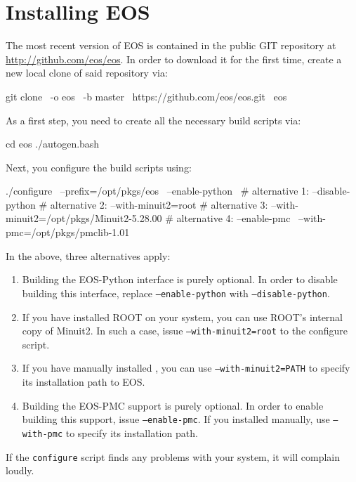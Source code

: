 \section{Installing EOS}

The most recent version of EOS is contained in the public GIT \cite{GIT}
repository at \url{http://github.com/eos/eos}.  In order to download it for the
first time, create a new local clone of said repository via:
%
\begin{commandline}
git clone \
    -o eos \
    -b master \
    https://github.com/eos/eos.git \
    eos
\end{commandline}


As a first step, you need to create all the necessary build scripts via:
%
\begin{commandline}
cd eos
./autogen.bash
\end{commandline}
%
Next, you configure the build scripts using:
%
\begin{commandline}
./configure \
    --prefix=/opt/pkgs/eos \
    --enable-python \
    # alternative 1: --disable-python
    # alternative 2: --with-minuit2=root
    # alternative 3: --with-minuit2=/opt/pkgs/Minuit2-5.28.00
    # alternative 4: --enable-pmc \
                     --with-pmc=/opt/pkgs/pmclib-1.01
\end{commandline}
%
In the above, three alternatives apply:
\begin{enumerate}
    \item Building the EOS-Python interface is purely optional. In order to disable building
    this interface, replace \texttt{--enable-python} with \texttt{--disable-python}.
    \item If you have installed ROOT on your system, you can use ROOT's internal copy of Minuit2.
    In such a case, issue \texttt{--with-minuit2=root} to the configure script.
    \item If you have manually installed , you can use \texttt{--with-minuit2=PATH}
    to specify its installation path to EOS.
    \item Building the EOS-PMC support is purely optional. In order to enable building this
    support, issue \texttt{--enable-pmc}. If you installed  manually, use
    \texttt{--with-pmc} to specify its installation path.
\end{enumerate}
If the \texttt{configure} script finds any problems with your system, it will complain loudly.\\

